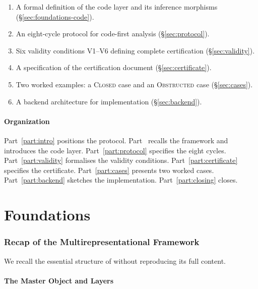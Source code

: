 \documentclass[11pt,a4paper]{article}
\theoremstyle{definition}
\theoremstyle{plain}
\begin{document}
\begin{enumerate}[label=(\roman*)]
  \item A formal definition of the code layer and its inference
        morphisms (\S\ref{sec:foundations-code}).
  \item An eight-cycle protocol for code-first analysis
        (\S\ref{sec:protocol}).
  \item Six validity conditions V1--V6 defining complete
        certification (\S\ref{sec:validity}).
  \item A specification of the certification document
        (\S\ref{sec:certificate}).
  \item Two worked examples: a \textsc{Closed} case and an
        \textsc{Obstructed} case (\S\ref{sec:cases}).
  \item A backend architecture for implementation
        (\S\ref{sec:backend}).
\end{enumerate}

\subsection{Organization}

Part~\ref{part:intro} positions the protocol. Part~\ref{part:foundations}
recalls the framework and introduces the code layer. Part~\ref{part:protocol}
specifies the eight cycles. Part~\ref{part:validity} formalises the
validity conditions. Part~\ref{part:certificate} specifies the
certificate. Part~\ref{part:cases} presents two worked cases.
Part~\ref{part:backend} sketches the implementation. Part~\ref{part:closing}
closes.

\part{Foundations}
\label{part:foundations}

\section{Recap of the Multirepresentational Framework}
\label{sec:foundations-recap}

We recall the essential structure of \cite{framework} without
reproducing its full content.

\subsection{The Master Object and Layers}
\end{document}
